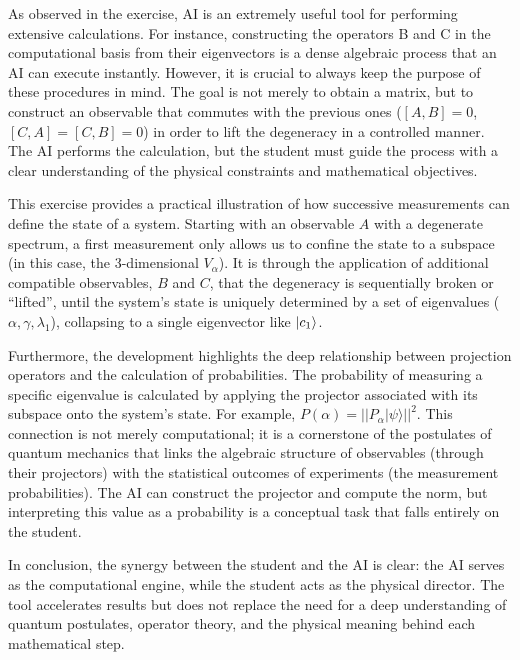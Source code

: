 \documentclass[11pt,a4paper]{article}
\begin{document}
As observed in the exercise, AI is an extremely useful tool for performing
extensive calculations. For instance, constructing the operators B and C in the
computational basis from their eigenvectors is a dense algebraic process that an
AI can execute instantly. However, it is crucial to always keep the purpose of
these procedures in mind. The goal is not merely to obtain a matrix, but to
construct an observable that commutes with the previous ones ($[A,B]=0$,
$[C,A]=[C,B]=0$) in order to lift the degeneracy in a controlled manner. The AI
performs the calculation, but the student must guide the process with a clear
understanding of the physical constraints and mathematical objectives.

This exercise provides a practical illustration of how successive measurements
can define the state of a system. Starting with an observable $A$ with a
degenerate spectrum, a first measurement only allows us to confine the state to
a subspace (in this case, the 3-dimensional $V_{\alpha}$). It is through the
application of additional compatible observables, $B$ and $C$, that the
degeneracy is sequentially broken or ``lifted'', until the system's state is
uniquely determined by a set of eigenvalues ($\alpha, \gamma, \lambda_{1}$),
collapsing to a single eigenvector like $\ket{c_{1}}$.

Furthermore, the development highlights the deep relationship between projection
operators and the calculation of probabilities. The probability of measuring a
specific eigenvalue is calculated by applying the projector associated with its
subspace onto the system's state. For example, $P(\alpha) =
||P_{\alpha}|\psi\rangle||^2$. This connection is not merely computational; it
is a cornerstone of the postulates of quantum mechanics that links the algebraic
structure of observables (through their projectors) with the statistical
outcomes of experiments (the measurement probabilities). The AI can construct
the projector and compute the norm, but interpreting this value as a probability
is a conceptual task that falls entirely on the student.

In conclusion, the synergy between the student and the AI is clear: the AI
serves as the computational engine, while the student acts as the physical
director. The tool accelerates results but does not replace the need for a deep
understanding of quantum postulates, operator theory, and the physical meaning
behind each mathematical step.
\end{document}
